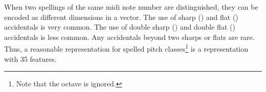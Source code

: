 
When two spellings of the same \gls{midi} note number are
distinguished, they can be encoded as different dimensions
in a vector. The use of sharp (\musSharp{}) and flat (\musFlat{})
accidentals is very common. The use of double sharp (\musDoubleSharp{})
and double flat (\musDoubleFlat{}) accidentals is less common.
Any accidentals beyond two sharps or flats are rare. Thus, a
reasonable representation for spelled pitch
classes\footnote{Note that the octave is ignored.} is a
representation with 35 features.
